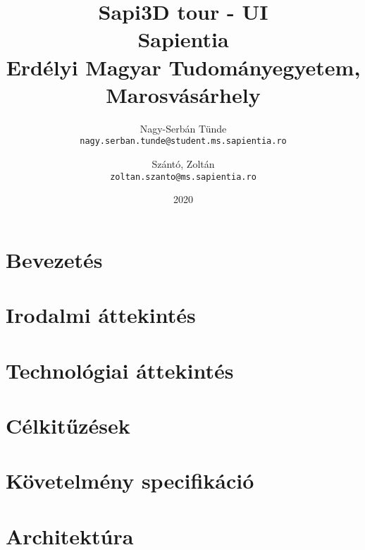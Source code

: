\documentclass[12pt]{report}
\title{
	{Sapi3D tour - UI}\\
	{\large Sapientia\\
		Erdélyi Magyar Tudományegyetem, Marosvásárhely}
}
\author{
	Nagy-Serbán Tünde\\
	\texttt{nagy.serban.tunde@student.ms.sapientia.ro}
	\and
	Szántó, Zoltán\\
	\texttt{zoltan.szanto@ms.sapientia.ro}	
}
\date{2020}
\begin{document}
	
	\maketitle
	
	
	\tableofcontents
	
	\listoffigures
	
	\listoftables
	
	\chapter{Bevezetés}
	
	
	\chapter{Irodalmi áttekintés}
	
	\chapter{Technológiai áttekintés}
	
	
	
	\chapter{Célkitűzések}
	
	
	\chapter{Követelmény specifikáció}
	
	
	\pagebreak
	
	
	\chapter{Architektúra}
	
	
\end{document}
